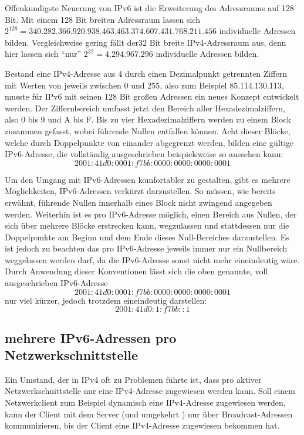 \documentclass[a4paper,12pt]{scrartcl}
\begin{document}
Offenkundigste Neuerung von IPv6 ist die Erweiterung des Adressraums auf 128 Bit. Mit einem 128 Bit breiten Adressraum lassen sich \\
$2^{128} = 340.282.366.920.938.463.463.374.607.431.768.211.456$ individuelle Adressen bilden. Vergleichweise gering fällt der32 Bit breite IPv4-Adressraum aus, denn hier lassen sich "`nur"' $2^{32} = 4.294.967.296$ individuelle Adressen bilden. 

Bestand eine IPv4-Adresse aus 4 durch einen Dezimalpunkt getrennten Ziffern mit Werten von jeweils zwischen 0 und 255, also zum Beispiel 85.114.130.113, musste für IPv6 mit seinen 128 Bit großen Adressen ein neues Konzept entwickelt werden.
Der Ziffernbereich umfasst jetzt den Bereich aller Hexadezimalziffern, also 0 bis 9 und A bis F. Bis zu vier Hexadezimalziffern werden zu einem Block zusammen gefasst, wobei führende Nullen entfallen können. Acht dieser Blöcke, welche durch Doppelpunkte von einander abgegrenzt werden, bilden eine gültige IPv6-Adresse, die vollständig ausgeschrieben  beispielsweise so aussehen kann:  \[ 2001:41d0:0001:f7bb:0000:0000:0000:0001 \]

Um den Umgang mit IPv6-Adressen komfortabler zu gestalten, gibt es mehrere Möglichkeiten, IPv6-Adressen verkürzt darzustellen. So müssen, wie bereits erwähnt, führende Nullen innerhalb eines Block nicht zwingend angegeben werden. Weiterhin ist es pro IPv6-Adresse möglich, einen Bereich aus Nullen, der sich über mehrere Blöcke erstrecken kann, wegzulassen und stattdessen nur die Doppelpunkte am Beginn und dem Ende dieses Null-Bereiches darzustellen. Es ist jedoch zu beachten das pro IPv6-Adresse jeweils immer nur ein Nullbereich weggelassen werden darf, da die IPv6-Adresse sonst nicht mehr eineindeutig wäre. Durch Anwendung dieser Konventionen lässt sich die oben genannte, voll ausgeschrieben IPv6-Adresse
\[ 2001:41d0:0001:f7bb:0000:0000:0000:0001 \]
nur viel kürzer, jedoch trotzdem eineindeutig darstellen:
 \[ 2001:41d0:1:f7bb::1 \]
 

\subsection{mehrere IPv6-Adressen pro Netzwerkschnittstelle}

Ein Umstand, der in IPv4 oft zu Problemen f\"uhrte ist, dass pro aktiver Netzwerkschnittstelle nur eine IPv4-Adresse zugewiesen werden kann. Soll einem Netzwerkclient zum Beispiel dynamisch eine IPv4-Adresse zugewiesen werden, kann der Client mit dem Server (und umgekehrt ) nur \"uber Broadcast-Adressen kommunizieren, bis der Client eine IPv4-Adresse zugewiesen bekommen hat.
\end{document}
